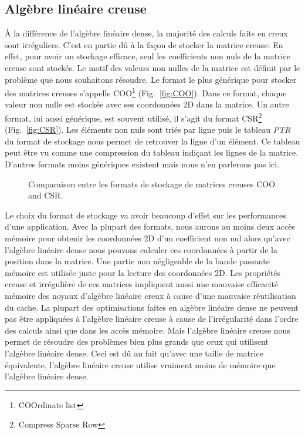 \subsection{Algèbre linéaire creuse}
\`{A} la différence de l'algèbre linéaire dense, la majorité des calculs faits en creux sont irréguliers.
%
C'est en partie dû à la façon de stocker la matrice creuse.
%
En effet, pour avoir un stockage efficace, seul les coefficients non nuls de la matrice creuse sont stockés.
%
Le motif des valeurs non nulles de la matrice est définit par le problème que nous souhaitons résoudre.
%
Le format le plus générique pour stocker des matrices creuses s'appelle COO\footnote{COOrdinate list} (Fig.~\ref{fig:COO}).
%
Dans ce format, chaque valeur non nulle est stockée avec ses coordonnées 2D dans la matrice.
%
Un autre format, lui aussi générique, est souvent utilisé, il s'agit du format CSR\footnote{Compress Sparse Row} (Fig.~\ref{fig:CSR}).
%
Les éléments non nuls sont triés par ligne puis le tableau {\em PTR} du format de stockage nous permet de retrouver la ligne d'un élément.
%
Ce tableau peut être vu comme une compression du tableau indiçant les lignes de la matrice.
%
D'autres formats moins génériques existent mais nous n'en parlerons pas ici.

\begin{figure}[!h]
     \begin{center}
    \end{center}
    \caption{Comparaison entre les formats de stockage de matrices creuses COO and CSR.}
    \label{fig:matrix_storage}
\end{figure}

Le choix du format de stockage va avoir beaucoup d'effet sur les performances d'une application.
%
Avec la plupart des formats, nous aurons au moins deux accès mémoire pour obtenir les coordonnées 2D d'un coefficient non nul alors qu'avec l'algèbre linéaire dense nous pouvons calculer ces coordonnées à partir de la position dans la matrice.
%
Une partie non négligeable de la bande passante mémoire est utilisée juste pour la lecture des coordonnées 2D.
%
Les propriétés creuse et irrégulière de ces matrices impliquent aussi une mauvaise efficacité mémoire des noyaux d'algèbre linéaire creux à cause d'une mauvaise réutilisation du cache.
%
La plupart des optimisations faites en algèbre linéaire dense ne peuvent pas être appliquées à l'algèbre linéaire creuse à cause de l'irrégularité dans l'ordre des calculs ainsi que dans les accès mémoire.
%
Mais l'algèbre linéaire creuse nous permet de résoudre des problèmes bien plus grands que ceux qui utilisent l'algèbre linéaire dense.
%
Ceci est dû au fait qu'avec une taille de matrice équivalente, l'algèbre linéaire creuse utilise vraiment moins de mémoire que l'algèbre linéaire dense.


